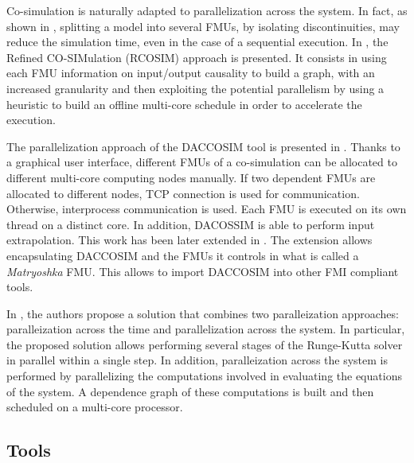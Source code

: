 Co-simulation is naturally adapted to parallelization across the system. In fact, as shown in \cite{Benkhaled_A_2012_ECOSM}, splitting a model into several FMUs, by isolating discontinuities, may reduce the simulation time, even in the case of a sequential execution. In \cite{benkhaled:2014}, the Refined CO-SIMulation (RCOSIM) approach is presented. It consists in using each FMU information on input/output causality to build a graph, with an increased granularity and then exploiting the potential parallelism by using a heuristic to build an offline multi-core schedule in order to accelerate the execution.

The parallelization approach of the DACCOSIM tool is presented in \cite{galtie:2015}. Thanks to a graphical user interface, different FMUs of a co-simulation can be allocated to different multi-core computing nodes manually. If two dependent FMUs are allocated to different nodes, TCP connection is used for communication. Otherwise, interprocess communication is used. Each FMU is executed on its own thread on a distinct core. In addition, DACOSSIM is able to perform input extrapolation. This work has been later extended in \cite{galtier:2017_experimenting}. The extension allows encapsulating DACCOSIM and the FMUs it controls in what is called a \textit{Matryoshka} FMU. This allows to import DACCOSIM into other FMI compliant tools.


In \cite{lundvall:2007}, the authors propose a solution that combines two paralleization approaches: paralleization across the time and parallelization across the system. In particular, the proposed solution allows performing several stages of the Runge-Kutta solver in parallel within a single step. In addition, paralleization across the system is performed by parallelizing the computations involved in evaluating the equations of the system. A dependence graph of these computations is built and then scheduled on a multi-core processor. 

\subsection{Tools}

